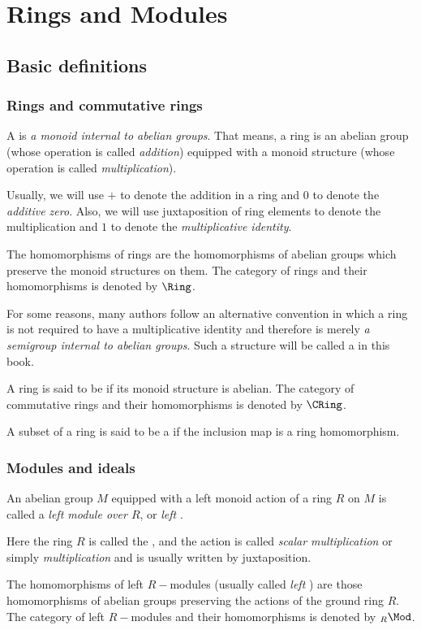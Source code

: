 \chapter{Rings and Modules}
\minitoc
\newpage
\section{Basic definitions}
\subsection{Rings and commutative rings}
  A  is \emph{a monoid internal to abelian groups}. That means, a ring is an abelian group (whose operation is called \emph{addition}) equipped with a monoid structure (whose operation is called \emph{multiplication}).
  \begin{rem}
    Usually, we will use $+$ to denote the addition in a ring and $0$ to denote the \emph{additive zero}. Also, we will use juxtaposition of ring elements to denote the multiplication and $1$ to denote the \emph{multiplicative identity}.
  \end{rem}
  The homomorphisms of rings are the homomorphisms of abelian groups which preserve the monoid structures on them. The category of rings and their homomorphisms is denoted by $\Ring$.
  \begin{rem}
    For some reasons, many authors follow an alternative convention in which a ring is not required to have a multiplicative identity and therefore is merely \emph{a semigroup internal to abelian groups}. Such a structure will be called a  in this book.
  \end{rem}

  A ring is said to be  if its monoid structure is abelian. The category of commutative rings and their homomorphisms is denoted by $\CRing$.

  A subset of a ring is said to be a  if the inclusion map is a ring homomorphism.

\subsection{Modules and ideals}
  An abelian group $M$ equipped with a left monoid action of a ring $R$ on $M$ is called a \emph{left module over $R$}, or \emph{left} .
  \begin{rem}
    Here the ring $R$ is called the , and the action is called \emph{scalar multiplication} or simply \emph{multiplication} and is usually written by juxtaposition.
  \end{rem}
  The homomorphisms of left $R-$modules (usually called \emph{left} ) are those homomorphisms of abelian groups preserving the actions of the ground ring $R$. The category of left $R-$modules and their homomorphisms is denoted by $_R\Mod$.

